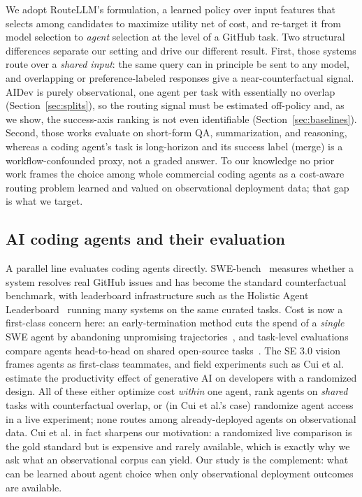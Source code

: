 \documentclass[sigconf,nonacm]{acmart}
\begin{document}
We adopt RouteLLM's formulation, a learned policy over input features that selects among candidates to maximize utility net of cost, and re-target it from model selection to \emph{agent} selection at the level of a GitHub task. Two structural differences separate our setting and drive our different result. First, those systems route over a \emph{shared input}: the same query can in principle be sent to any model, and overlapping or preference-labeled responses give a near-counterfactual signal. AIDev is purely observational, one agent per task with essentially no overlap (Section~\ref{sec:splits}), so the routing signal must be estimated off-policy and, as we show, the success-axis ranking is not even identifiable (Section~\ref{sec:baselines}). Second, those works evaluate on short-form QA, summarization, and reasoning, whereas a coding agent's task is long-horizon and its success label (merge) is a workflow-confounded proxy, not a graded answer. To our knowledge no prior work frames the choice among whole commercial coding agents as a cost-aware routing problem learned and valued on observational deployment data; that gap is what we target.

\subsection{AI coding agents and their evaluation}

A parallel line evaluates coding agents directly. SWE-bench~\cite{jimenez2024swebench} measures whether a system resolves real GitHub issues and has become the standard counterfactual benchmark, with leaderboard infrastructure such as the Holistic Agent Leaderboard~\cite{holistic2025leaderboard} running many systems on the same curated tasks. Cost is now a first-class concern here: an early-termination method cuts the spend of a \emph{single} SWE agent by abandoning unpromising trajectories~\cite{eet2026}, and task-level evaluations compare agents head-to-head on shared open-source tasks~\cite{tasklevel2026eval}. The SE 3.0 vision~\cite{li2025se3} frames agents as first-class teammates, and field experiments such as Cui et al.~\cite{cui2024genai} estimate the productivity effect of generative AI on developers with a randomized design. All of these either optimize cost \emph{within} one agent, rank agents on \emph{shared} tasks with counterfactual overlap, or (in Cui et al.'s case) randomize agent access in a live experiment; none routes among already-deployed agents on observational data. Cui et al. in fact sharpens our motivation: a randomized live comparison is the gold standard but is expensive and rarely available, which is exactly why we ask what an observational corpus can yield. Our study is the complement: what can be learned about agent choice when only observational deployment outcomes are available.
\end{document}
